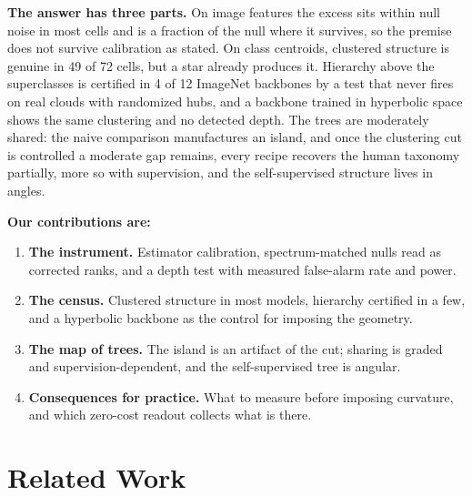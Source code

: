 \documentclass{article}
\theoremstyle{definition}
\begin{document}
\textbf{The answer has three parts.} On image features the excess sits within null noise in most cells and is a fraction of the null where it survives, so the premise does not survive calibration as stated. On class centroids, clustered structure is genuine in 49 of 72 cells, but a star already produces it. Hierarchy above the superclasses is certified in 4 of 12 ImageNet backbones by a test that never fires on real clouds with randomized hubs, and a backbone trained in hyperbolic space shows the same clustering and no detected depth. The trees are moderately shared: the naive comparison manufactures an island, and once the clustering cut is controlled a moderate gap remains, every recipe recovers the human taxonomy partially, more so with supervision, and the self-supervised structure lives in angles. %

\textbf{Our contributions are:}
\begin{enumerate}[topsep=0pt,itemsep=1pt,leftmargin=*]
\item \textbf{The instrument.} Estimator calibration, spectrum-matched nulls read as corrected ranks, and a depth test with measured false-alarm rate and power.
\item \textbf{The census.} Clustered structure in most models, hierarchy certified in a few, and a hyperbolic backbone as the control for imposing the geometry.
\item \textbf{The map of trees.} The island is an artifact of the cut; sharing is graded and supervision-dependent, and the self-supervised tree is angular.
\item \textbf{Consequences for practice.} What to measure before imposing curvature, and which zero-cost readout collects what is there.
\end{enumerate}


\section{Related Work}
\label{sec:related}
\end{document}
